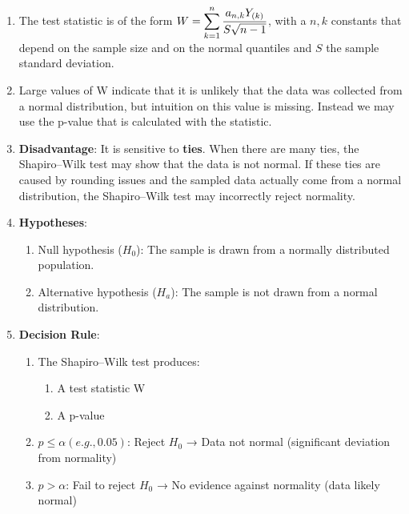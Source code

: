 \begin{enumerate}
    \item  The test statistic is of the form $W = \displaystyle\sum^n_{k=1} \dfrac{a _{n,k} Y_{(k)}}{S\sqrt{n - 1}}$, with a $n,k$ constants that depend on the sample size and on the normal quantiles and $S$ the sample standard deviation.
    \hfill \cite{statistics/book/Statistics-for-Data-Scientists/Maurits-Kaptein}

    \item  Large values of W indicate that it is unlikely that the data was collected from a normal distribution, but intuition on this value is missing. 
    Instead we may use the p-value that is calculated with the statistic. 
    \hfill \cite{statistics/book/Statistics-for-Data-Scientists/Maurits-Kaptein}

    \item \textbf{Disadvantage}:  It is sensitive to \textbf{ties}.
    When there are many ties, the Shapiro–Wilk test may show that the data is not normal. 
    If these ties are caused by rounding issues and the sampled data actually come from a normal distribution, the Shapiro–Wilk test may incorrectly reject normality. 
    \hfill \cite{statistics/book/Statistics-for-Data-Scientists/Maurits-Kaptein}

    \item \textbf{Hypotheses}:
    \begin{enumerate}
        \item Null hypothesis ($H_0$): The sample is drawn from a normally distributed population.

        \item Alternative hypothesis ($H_a$): The sample is not drawn from a normal distribution.
    \end{enumerate}

    \item \textbf{Decision Rule}:
    \hfill \cite{common/online/chatgpt}
    \begin{enumerate}
        \item The Shapiro–Wilk test produces:
        \hfill \cite{common/online/chatgpt}
        \begin{enumerate}
            \item A test statistic W
            \hfill \cite{common/online/chatgpt}

            \item A p-value
            \hfill \cite{common/online/chatgpt}
        \end{enumerate}

        \item $p\leq \alpha (e.g., 0.05)$: Reject $H_0$ → Data not normal (significant deviation from normality)
        \hfill \cite{common/online/chatgpt}

        \item $p>\alpha$: Fail to reject $H_0$ → No evidence against normality (data likely normal)
        \hfill \cite{common/online/chatgpt}
    \end{enumerate}
\end{enumerate}


